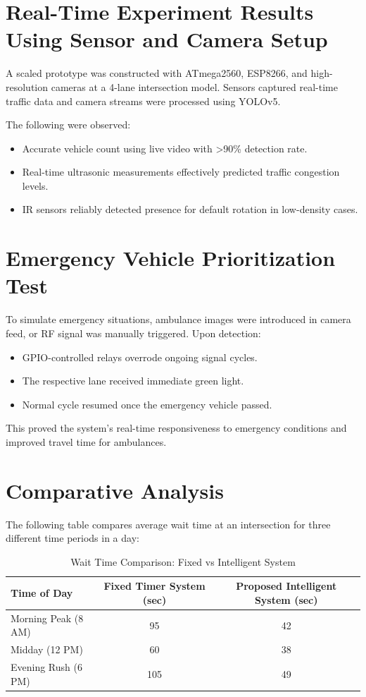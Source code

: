 \documentclass[12pt]{report}
\begin{document}
\section{Real-Time Experiment Results Using Sensor and Camera Setup}

A scaled prototype was constructed with ATmega2560, ESP8266, and high-resolution cameras at a 4-lane intersection model. Sensors captured real-time traffic data and camera streams were processed using YOLOv5.

The following were observed:
\begin{itemize}
    \item Accurate vehicle count using live video with >90\% detection rate.
    \item Real-time ultrasonic measurements effectively predicted traffic congestion levels.
    \item IR sensors reliably detected presence for default rotation in low-density cases.
\end{itemize}

\section{Emergency Vehicle Prioritization Test}

To simulate emergency situations, ambulance images were introduced in camera feed, or RF signal was manually triggered. Upon detection:
\begin{itemize}
    \item GPIO-controlled relays overrode ongoing signal cycles.
    \item The respective lane received immediate green light.
    \item Normal cycle resumed once the emergency vehicle passed.
\end{itemize}

This proved the system’s real-time responsiveness to emergency conditions and improved travel time for ambulances.

\section{Comparative Analysis}

The following table compares average wait time at an intersection for three different time periods in a day:

\begin{table}[H]
\centering
\caption{Wait Time Comparison: Fixed vs Intelligent System}
\label{tab:waittime}
\begin{tabular}{|p{4cm}|c|c|}
\hline
\textbf{Time of Day} & \textbf{Fixed Timer System (sec)} & \textbf{Proposed Intelligent System (sec)} \\
\hline
Morning Peak (8 AM) & 95 & 42 \\
Midday (12 PM) & 60 & 38 \\
Evening Rush (6 PM) & 105 & 49 \\
\hline
\end{tabular}
\end{table}
\end{document}
